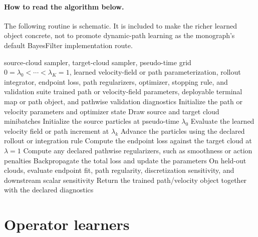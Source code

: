 \paragraph{How to read the algorithm below.}
The following routine is schematic.  It is included to make the richer learned
object concrete, not to promote dynamic-path learning as the monograph's default
BayesFilter implementation route.

\begin{algorithm}[ht]
\caption{\texttt{train\_dynamic\_transport\_path}}
\begin{algorithmic}[1]
\Require source-cloud sampler, target-cloud sampler, pseudo-time grid \(0=\lambda_0<\cdots<\lambda_K=1\), learned velocity-field or path parameterization, rollout integrator, endpoint loss, path regularizers, optimizer, stopping rule, and validation suite
\Ensure trained path or velocity-field parameters, deployable terminal map or path object, and pathwise validation diagnostics
\State Initialize the path or velocity parameters and optimizer state
  \State Draw source and target cloud minibatches
  \State Initialize the source particles at pseudo-time \(\lambda_0\)
    \State Evaluate the learned velocity field or path increment at \(\lambda_k\)
    \State Advance the particles using the declared rollout or integration rule
  \EndFor
  \State Compute the endpoint loss against the target cloud at \(\lambda=1\)
  \State Compute any declared pathwise regularizers, such as smoothness or action penalties
  \State Backpropagate the total loss and update the parameters
\EndWhile
  \State On held-out clouds, evaluate endpoint fit, path regularity,
  discretization sensitivity, and downstream scalar sensitivity
  \State Return the trained path/velocity object together with the declared
  diagnostics
\end{algorithmic}
\end{algorithm}

\section{Operator learners}
\label{sec:bf-neural-ot-dynamic-operator}


